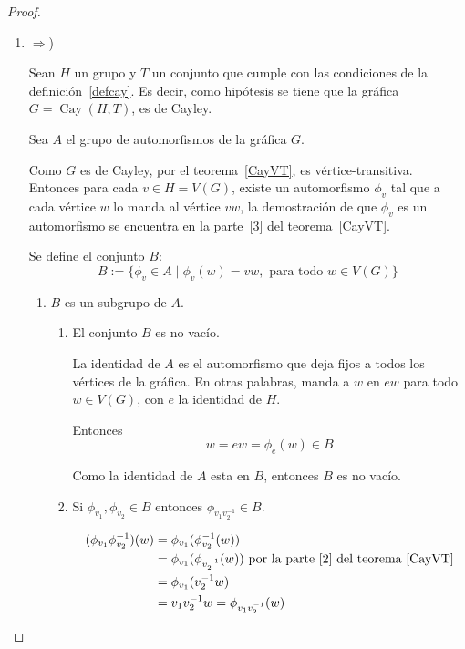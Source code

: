 \documentclass[11pt]{book}
\theoremstyle{definition}
\DeclareMathOperator{\Cay}{Cay}
\begin{document}
\begin{proof}
\begin{enumerate}

\item$\Rightarrow$) 

Sean $H$ un grupo y $T$ un conjunto que cumple con las
condiciones de la definición~\ref{defcay}. Es decir, como hipótesis se
tiene que la gráfica $G=\Cay(H,T)$, es de Cayley. 

Sea $A$ el grupo de automorfismos de la gráfica $G$.


Como $G$ es de Cayley, por el teorema~\ref{CayVT}, es
vértice-transitiva. Entonces para cada $v \in H=V(G)$, existe un
automorfismo $\phi_v$ tal que a cada vértice $w$
lo manda al vértice $vw$, la demostración de que $\phi_v$ es un
automorfismo se encuentra en  la parte~\ref{3} del
teorema~\ref{CayVT}.

 Se define el conjunto $B$:
\begin{equation*}
B:=\{
\phi_{v} \in A \mid \phi_{v} (w)=vw,\text{ para todo }  w\in V(G)\}\end{equation*}
\begin{enumerate}

\item $B$ es un subgrupo de $A$.

\begin{enumerate}

\item El conjunto $B$ es no vacío. 

La identidad de $A$ es el automorfismo que deja fijos a todos los
vértices de la gráfica. En otras palabras, manda a
$w$ en $ew$ para todo $w\in V(G)$, con $e$ la identidad de $H$.

Entonces 
\begin{equation*}
w=ew=\phi_e(w) \in B
\end{equation*}

Como la identidad de $A$ esta en $B$, entonces $B$ es no vacío.

\item
Si $\phi_{v_1}, \phi_{v_2} \in B$ entonces $\phi_{v_1v_2^{-1}} \in B$.

\begin{equation*}
  \begin{split}
    (\phi_{v_1}\phi_{v_2}^{-1})(w)&=\phi_{v_1}(\phi_{v_2}^{-1}(w))\\
    &=\phi_{v_1}(\phi_{v_2^{-1}}(w)) \text{ por la parte~\ref{2} del
    teorema~\ref{CayVT}}\\
    &=\phi_{v_1}(v_2^{-1}w)\\
    &=v_1v_2^{-1}w=\phi_{v_1v_2^{-1}}(w)
  \end{split}
\end{equation*}


\end{enumerate}
\end{enumerate}
\end{enumerate}
\end{proof}
\end{document}
